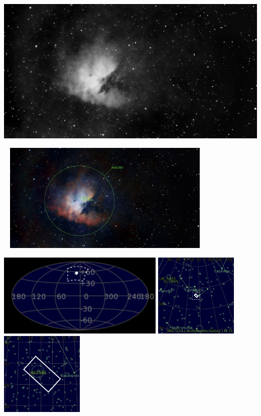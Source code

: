 {\footnotesize\color{white}


}\ \\
\includegraphics[width=\textwidth]{../Imaging//Grayscale/Pacman_Nebula.jpg}
\begin{center}
 \ \newpage
\includegraphics[width=0.75\textwidth]{../Imaging//Annotated/Pacman_Nebula_Annotated.jpg}

\includegraphics[height=4cm]{../Imaging//Annotated/Pacman_Nebula_Globe.jpg}
\includegraphics[height=4cm]{../Imaging//Annotated/Pacman_Nebula_Close.jpg}
\includegraphics[height=4cm]{../Imaging//Annotated/Pacman_Nebula_Closer.jpg}
\end{center}

